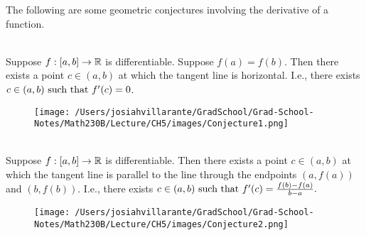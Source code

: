 
The following are some geometric conjectures involving the derivative of a function.

\begin{conjecture}\leavevmode\\
\label{Conj1}
Suppose $f:[a,b] \to \mathbb{R}$ is differentiable. Suppose $f(a) = f(b)$. Then there exists a point $c\in (a,b)$ at which the tangent line is horizontal. I.e., there exists $c\in(a,b) \text{ such that } f'(c) = 0$.
\end{conjecture}

\begin{figure}[h]
    \texttt{[image: /Users/josiahvillarante/GradSchool/Grad-School-Notes/Math230B/Lecture/CH5/images/Conjecture1.png]}
\end{figure}

\begin{conjecture}\leavevmode\\
\label{Conj2}
Suppose $f:[a,b] \to \mathbb{R}$ is differentiable. Then there exists a point $c \in (a,b)$ at which the tangent line is parallel to the line through the endpoints $(a, f(a))$ and $(b, f(b))$. I.e., there exists $c \in (a,b) \text{ such that } f'(c) = \frac{f(b) - f(a)}{b - a}.$
\end{conjecture}

\begin{figure}[h]
    \texttt{[image: /Users/josiahvillarante/GradSchool/Grad-School-Notes/Math230B/Lecture/CH5/images/Conjecture2.png]}
\end{figure}

